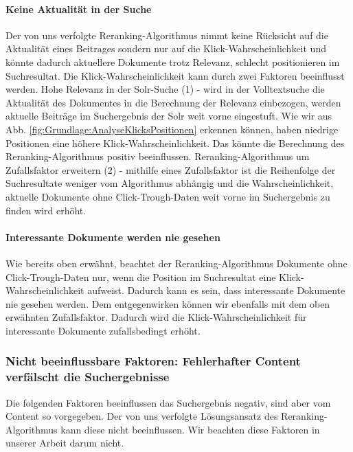 \paragraph{Keine Aktualität in der Suche}
Der von uns verfolgte Reranking-Algorithmus nimmt keine Rücksicht auf die \glqq Aktualität\grqq{} eines Beitrages sondern nur auf die Klick-Wahrscheinlichkeit und könnte dadurch aktuellere Dokumente trotz Relevanz, schlecht positionieren im Suchresultat.  Die Klick-Wahrscheinlichkeit kann durch zwei Faktoren beeinflusst werden. Hohe Relevanz in der Solr-Suche (1) - wird in der Volltextsuche die Aktualität des Dokumentes in die Berechnung der Relevanz einbezogen, werden aktuelle Beiträge im Suchergebnis der Solr weit vorne eingestuft. Wie wir aus Abb. \ref{fig:Grundlage:AnalyseKlicksPositionen} erkennen können, haben niedrige Positionen eine höhere Klick-Wahrscheinlichkeit. Das könnte die Berechnung des Reranking-Algorithmus positiv beeinflussen. Reranking-Algorithmus um Zufallsfaktor erweitern (2) - mithilfe eines Zufallsfaktor ist die Reihenfolge der Suchresultate weniger vom Algorithmus abhängig und die Wahrscheinlichkeit, aktuelle Dokumente ohne Click-Trough-Daten weit vorne im Suchergebnis zu finden wird erhöht.

\paragraph{Interessante Dokumente werden nie gesehen}
Wie bereits oben erwähnt, beachtet der Reranking-Algorithmus Dokumente ohne Click-Trough-Daten nur, wenn die Position im Suchresultat eine Klick-Wahrscheinlichkeit aufweist. Dadurch kann es sein, dass interessante Dokumente nie gesehen werden. Dem entgegenwirken können wir ebenfalls mit dem oben erwähnten Zufallsfaktor. Dadurch wird die Klick-Wahrscheinlichkeit für interessante Dokumente zufallsbedingt erhöht.

\subsubsection{Nicht beeinflussbare Faktoren: Fehlerhafter Content verfälscht die Suchergebnisse}
\label{sec:Grundlagen:Grundbegriffe:SemantikUserInteraktionen:FehlerhafterContent}

Die folgenden Faktoren beeinflussen das Suchergebnis negativ, sind aber vom Content so vorgegeben. Der von uns verfolgte Lösungsansatz des Reranking-Algorithmus kann diese nicht beeinflussen. Wir beachten diese Faktoren in unserer Arbeit darum nicht.

